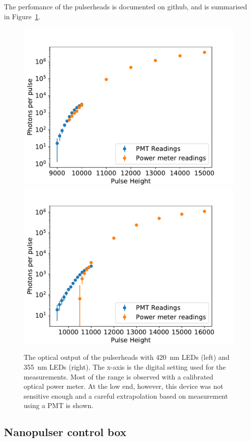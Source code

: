 The perfomance of the pulserheads is documented on github\cite{GITHUB_TEST}, and is summarised in Figure~\ref{figure:pulserhead_output}.

\begin{figure}
\begin{center}	
  \includegraphics[width=0.48\linewidth]{figures/PhotonCounts420nm.pdf}
  \includegraphics[width=0.48\linewidth]{figures/PhotonCounts355nm.pdf}
  \caption{The optical output of the pulserheads with 420~nm LEDs (left) and 355~nm LEDs (right). The x-axis is the digital setting used for the measurements. Most of the range is observed with a calibrated optical power meter. At the low end, however, this device was not sensitive enough and a careful extrapolation based on measurement using a PMT is shown.}
  \label{figure:pulserhead_output}
\end{center}
\end{figure}


\subsection*{Nanopulser control box}


